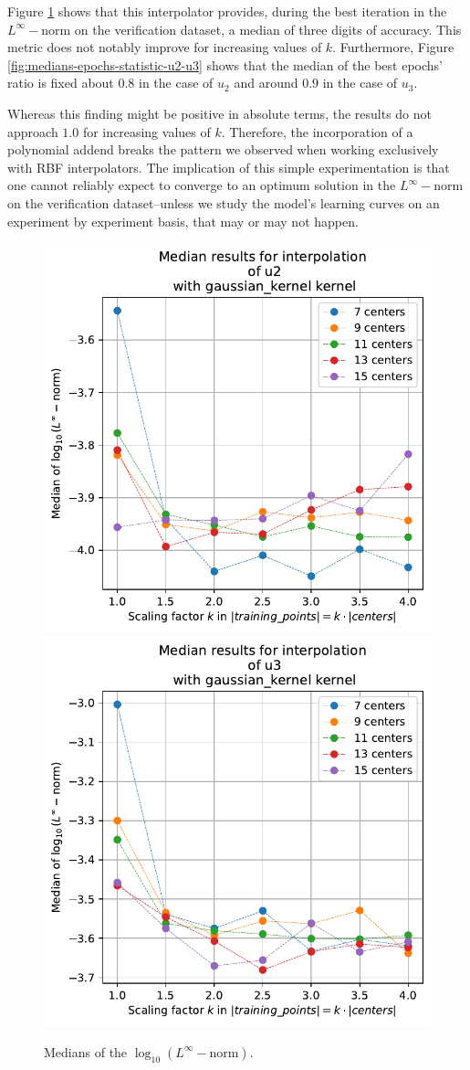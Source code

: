 \documentclass[12pt]{report} %
\begin{document}
Figure \ref{fig:medians-linf-statistic-u2-u3} shows that this interpolator provides, during the best iteration in the $L^\infty-$norm on the verification dataset, a median of three digits of accuracy. This metric does not notably improve for increasing values of $k$. Furthermore, Figure \ref{fig:medians-epochs-statistic-u2-u3} shows that the median of the best epochs' ratio is fixed about $0.8$ in the case of $u_2$ and around $0.9$ in the case of $u_3$. 

Whereas this finding might be positive in absolute terms, the results do not approach $1.0$ for increasing values of $k$. Therefore, the incorporation of a polynomial addend breaks the pattern we observed when working exclusively with RBF interpolators. The implication of this simple experimentation is that one cannot reliably expect to converge to an optimum solution in the $L^\infty-$norm on the verification dataset--unless we study the model's learning curves on an experiment by experiment basis, that may or may not happen.


\begin{figure}[H]
  
  {\includegraphics[height=.45\textwidth]
    {imagenes/experiments/1d/statistical_1d_full/u2/medians_linf_u2_gaussian_kernel.pdf}}
  {\includegraphics[height=.45\textwidth]
    {imagenes/experiments/1d/statistical_1d_full/u3/medians_linf_u3_gaussian_kernel.pdf}}
  \caption{Medians of the $\log_{10}(L^\infty-\text{norm})$.}
  \label{fig:medians-linf-statistic-u2-u3}
\end{figure}
\end{document}
